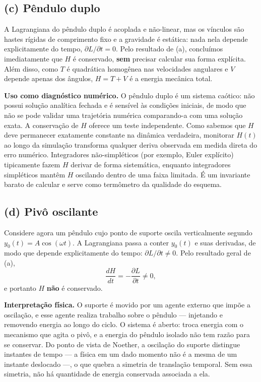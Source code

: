 \documentclass{article}
\begin{document}
\subsection*{(c) Pêndulo duplo}

A Lagrangiana do pêndulo duplo é acoplada e não-linear, mas os vínculos são hastes
rígidas de comprimento fixo e a gravidade é estática: nada nela depende
explicitamente do tempo, $\partial L/\partial t = 0$. Pelo resultado de (a),
concluímos imediatamente que $H$ é conservado, \textbf{sem} precisar calcular sua
forma explícita. Além disso, como $T$ é quadrática homogênea nas velocidades
angulares e $V$ depende apenas dos ângulos, $H = T + V$ é a energia mecânica total.

\textbf{Uso como diagnóstico numérico.} O pêndulo duplo é um sistema caótico: não
possui solução analítica fechada e é sensível às condições iniciais, de modo que
não se pode validar uma trajetória numérica comparando-a com uma solução exata.
A conservação de $H$ oferece um teste independente. Como sabemos que $H$ deve
permanecer exatamente constante na dinâmica verdadeira, monitorar $H(t)$ ao longo
da simulação transforma qualquer deriva observada em medida direta do erro
numérico. Integradores não-simpléticos (por exemplo, Euler explícito) tipicamente
fazem $H$ derivar de forma sistemática, enquanto integradores simpléticos mantêm
$H$ oscilando dentro de uma faixa limitada. É um invariante barato de calcular e
serve como termômetro da qualidade do esquema.

\subsection*{(d) Pivô oscilante}

Considere agora um pêndulo cujo ponto de suporte oscila verticalmente segundo
$y_0(t) = A\cos(\omega t)$. A Lagrangiana passa a conter $y_0(t)$ e suas derivadas,
de modo que depende explicitamente do tempo: $\partial L/\partial t \neq 0$. Pelo
resultado geral de (a),
\[
\frac{dH}{dt} = -\frac{\partial L}{\partial t} \neq 0,
\]
e portanto $H$ \textbf{não} é conservado.

\textbf{Interpretação física.} O suporte é movido por um agente externo que impõe a
oscilação, e esse agente realiza trabalho sobre o pêndulo — injetando e removendo
energia ao longo do ciclo. O sistema é aberto: troca energia com o mecanismo que
agita o pivô, e a energia do pêndulo isolado não tem razão para se conservar. Do
ponto de vista de Noether, a oscilação do suporte distingue instantes de tempo — a
física em um dado momento não é a mesma de um instante deslocado —, o que quebra a
simetria de translação temporal. Sem essa simetria, não há quantidade de energia
conservada associada a ela.
\end{document}
